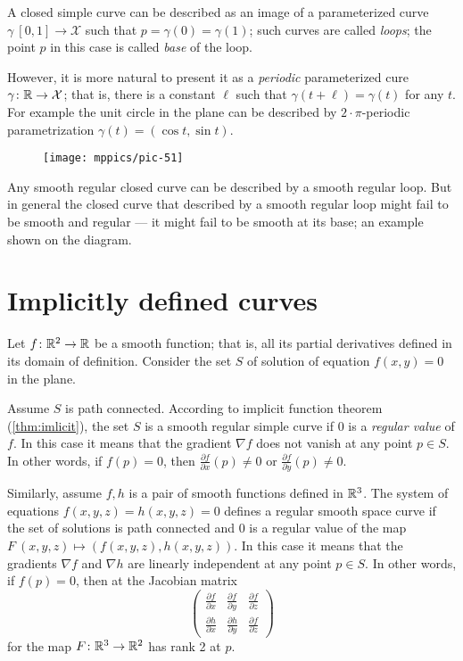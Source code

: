 A closed simple curve can be described as an image of a parameterized curve $\gamma\: [0,1]\to \mathcal{X}$ such that $p=\gamma(0)=\gamma(1)$;
such curves are called \emph{loops}; 
the point $p$ in this case is called \emph{base} of the loop.

However, it is more natural to present it as a \emph{periodic} parameterized cure $\gamma\colon \mathbb{R}\to \mathcal{X}$; that is, there is a constant $\ell$ such that $\gamma(t+\ell)=\gamma(t)$ for any $t$.
For example the unit circle in the plane can be described by $2{\cdot}\pi$-periodic parametrization $\gamma(t)=(\cos t,\sin t)$.

\begin{wrapfigure}{r}{17 mm}
\vskip-5mm
\centering
\texttt{[image: mppics/pic-51]}
\end{wrapfigure}

Any smooth regular closed curve can be described by a smooth regular loop.
But in general the closed curve that described by a smooth regular loop might fail to be smooth and regular --- it might fail to be smooth at its base; an example shown on the diagram.


\section*{Implicitly defined curves}

Let $f\colon\mathbb{R}^2\to \mathbb{R}$ be a smooth function; 
that is, all its partial derivatives defined in its domain of definition.
Consider the set $S$ of solution of equation $f(x,y)=0$ in the plane.

Assume $S$ is path connected.
According to implicit function theorem (\ref{thm:imlicit}), the set $S$ is a smooth regular simple curve if $0$ is a \emph{regular value} of $f$.
In this case it means that the gradient $\nabla f$ does not vanish at any point $p\in S$.
In other words, if $f(p)=0$, then  $\tfrac{\partial f}{\partial x}(p)\ne 0$ or $\tfrac{\partial f}{\partial y}(p)\ne 0$.

Similarly, assume $f,h$ is a pair of smooth functions defined in $\mathbb{R}^3$.
The system of equations
$f(x,y,z)=h(x,y,z)=0$
defines a regular smooth space curve if the set of solutions is path connected and $0$ is a regular value of the map $F\:(x,y,z)\mapsto (f(x,y,z),h(x,y,z))$.
In this case it means that the gradients $\nabla f$ and $\nabla h$ are linearly independent at any point $p\in S$.
In other words, if $f(p)=0$, then at the Jacobian matrix
\[
\begin{pmatrix}
\tfrac{\partial f}{\partial x}&\tfrac{\partial f}{\partial y}&\tfrac{\partial f}{\partial z}\\
\tfrac{\partial h}{\partial x}&\tfrac{\partial h}{\partial y}&\tfrac{\partial f}{\partial z}
\end{pmatrix}
\]
for the map $F\colon\mathbb{R}^3\to\mathbb{R}^2$ has rank 2 at $p$.

